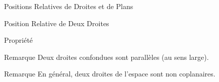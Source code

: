 \documentclass{cours}
\begin{document}
\begin{Gpartie}{Positions Relatives de Droites et de Plans}
\begin{Spartie}{Position Relative de Deux Droites}
\begin{SSpartie}{Propriété}
\begin{center}
                    \parbox{\linewidth}{}
                \end{center}
            \end{SSpartie}
            \begin{SSpartie}{Remarque} 
                Deux droites confondues sont parallèles (au sens large).
            \end{SSpartie}
            \begin{SSpartie}{Remarque} 
                En général, deux droites de l'espace sont non coplanaires.
            \end{SSpartie}
        \end{Spartie}
    \end{Gpartie}
\end{document}
